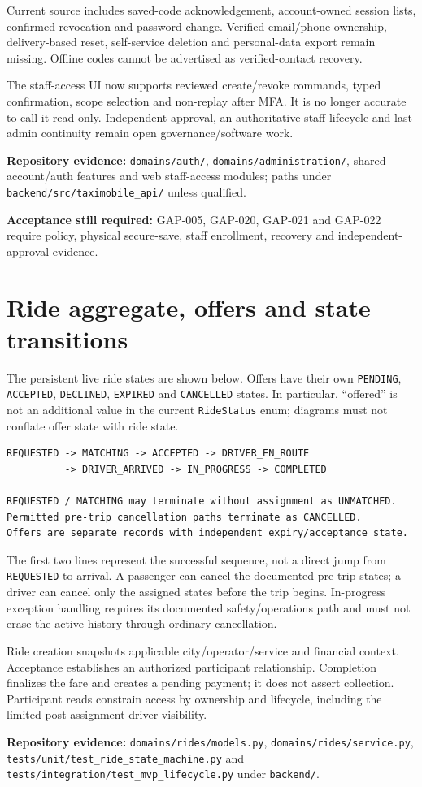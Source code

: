 \documentclass[11pt,a4paper]{article}
\newcommand{\src}[1]{{\small\nolinkurl{#1}}}
\newcommand{\evidence}[1]{\par\textbf{Repository evidence:} #1\par}
\newcommand{\gate}[1]{\par\textbf{Acceptance still required:} #1\par}
\begin{document}
Current source includes saved-code acknowledgement, account-owned session lists,
confirmed revocation and password change. Verified email/phone ownership,
delivery-based reset, self-service deletion and personal-data export remain
missing. Offline codes cannot be advertised as verified-contact recovery.

The staff-access UI now supports reviewed create/revoke commands, typed
confirmation, scope selection and non-replay after MFA. It is no longer accurate
to call it read-only. Independent approval, an authoritative staff lifecycle and
last-admin continuity remain open governance/software work.
\evidence{\src{domains/auth/}, \src{domains/administration/}, shared account/auth features and web staff-access modules; paths under \src{backend/src/taximobile_api/} unless qualified.}
\gate{GAP-005, GAP-020, GAP-021 and GAP-022 require policy, physical secure-save,
staff enrollment, recovery and independent-approval evidence.}

\section{Ride aggregate, offers and state transitions}
The persistent live ride states are shown below. Offers have their own
\src{PENDING}, \src{ACCEPTED}, \src{DECLINED}, \src{EXPIRED} and \src{CANCELLED}
states. In particular, ``offered'' is not an additional value in the current
\src{RideStatus} enum; diagrams must not conflate offer state with ride state.

\begin{lstlisting}
REQUESTED -> MATCHING -> ACCEPTED -> DRIVER_EN_ROUTE
          -> DRIVER_ARRIVED -> IN_PROGRESS -> COMPLETED

REQUESTED / MATCHING may terminate without assignment as UNMATCHED.
Permitted pre-trip cancellation paths terminate as CANCELLED.
Offers are separate records with independent expiry/acceptance state.
\end{lstlisting}
The first two lines represent the successful sequence, not a direct jump from
\src{REQUESTED} to arrival. A passenger can cancel the documented pre-trip
states; a driver can cancel only the assigned states before the trip begins.
In-progress exception handling requires its documented safety/operations path
and must not erase the active history through ordinary cancellation.

Ride creation snapshots applicable city/operator/service and financial context.
Acceptance establishes an authorized participant relationship. Completion
finalizes the fare and creates a pending payment; it does not assert collection.
Participant reads constrain access by ownership and lifecycle, including the
limited post-assignment driver visibility.
\evidence{\src{domains/rides/models.py}, \src{domains/rides/service.py}, \src{tests/unit/test_ride_state_machine.py} and \src{tests/integration/test_mvp_lifecycle.py} under \src{backend/}.}
\end{document}
